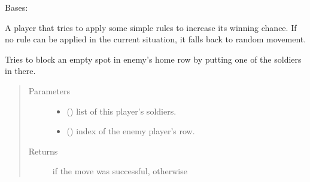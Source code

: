 \documentclass[letterpaper,10pt,english,openany,oneside]{sphinxmanual}
\begin{document}
\begin{fulllineitems}
\label{\detokenize{player:player.StrategyPlayer}}
Bases: {\hyperref[\detokenize{player:player.RandomPlayer}]{}}

A player that tries to apply some simple rules to increase its winning
chance. If no rule can be applied in the current situation, it falls
back to random movement.

\begin{fulllineitems}
\label{\detokenize{player:player.StrategyPlayer.avoid_enemy_row}}
\end{fulllineitems}


\begin{fulllineitems}
\label{\detokenize{player:player.StrategyPlayer.block_enemy_row}}
Tries to block an empty spot in enemy’s home row by putting one of the
soldiers in there.
\begin{quote}\begin{description}
\item[{Parameters}] \leavevmode\begin{itemize}
\item {} 
 () \textendash{} list of this player’s soldiers.

\item {} 
 () \textendash{} index of the enemy player’s row.

\end{itemize}

\item[{Returns}] \leavevmode
{} if the move was successful,  otherwise


\end{description}
\end{quote}
\end{fulllineitems}
\end{fulllineitems}
\end{document}
